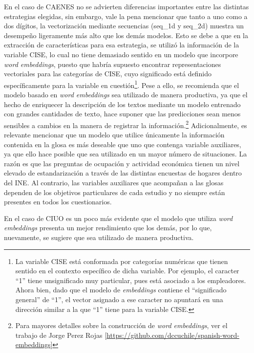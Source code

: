 \documentclass[
  12pt,
  spanish,
]{article}
\begin{document}
En el caso de CAENES no se advierten diferencias importantes entre las
distintas estrategias elegidas, sin embargo, vale la pena mencionar que
tanto a uno como a dos dígitos, la vectorización mediante secuencias
(seq\_1d y seq\_2d) muestra un desempeño ligeramente más alto que los
demás modelos. Esto se debe a que en la extracción de características
para esa estrategia, se utilizó la información de la variable CISE, lo
cual no tiene demasiado sentido en un modelo que incorpore \emph{word
embeddings}, puesto que habría supuesto encontrar representaciones
vectoriales para las categorías de CISE, cuyo significado está definido
específicamente para la variable en cuestión\footnote{La variable CISE
  está conformada por categorías numéricas que tienen sentido en el
  contexto específico de dicha variable. Por ejemplo, el caracter ``1''
  tiene unsignificado muy particular, pues está asociado a los
  empleadores. Ahora bien, dado que el modelo de \emph{embeddings}
  contiene el ``significado general'' de ``1'', el vector asignado a ese
  caracter no apuntará en una dirección similar a la que ``1'' tiene
  para la variable CISE.}. Pese a ello, se recomienda que el modelo
basado en \emph{word embeddings} sea utilizado de manera productiva, ya
que el hecho de enriquecer la descripción de los textos mediante un
modelo entrenado con grandes cantidades de texto, hace suponer que las
predicciones sean menos sensibles a cambios en la manera de registrar la
información.\footnote{Para mayores detalles sobre la construcción de
  \emph{word embeddings}, ver el trabajo de Jorge Perez Rojas
  {[}\url{https://github.com/dccuchile/spanish-word-embeddings}{]}}
Adicionalmente, es relevante mencionar que un modelo que utilice
únicamente la información contenida en la glosa es más deseable que uno
que contenga variable auxiliares, ya que ello hace posible que sea
utilizado en un mayor número de situaciones. La razón es que las
preguntas de ocupación y actividad económica tienen un nivel elevado de
estandarización a través de las distintas encuestas de hogares dentro
del INE. Al contrario, las variables auxiliares que acompañan a las
glosas dependen de los objetivos particulares de cada estudio y no
siempre están presentes en todos los cuestionarios.

En el caso de CIUO es un poco más evidente que el modelo que utiliza
\emph{word embeddings} presenta un mejor rendimiento que los demás, por
lo que, nuevamente, se sugiere que sea utilizado de manera productiva.
\end{document}
